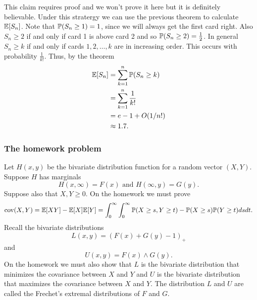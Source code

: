 This claim requires proof and we won't prove it here but it is definitely believable. Under this stratergy we can use the previous theorem to calculate ${\mathbb{E}}[S_n]$. Note that ${\mathbb{P}}(S_n \ge 1) = 1$, since we will always get the first card right. Also $S_n \ge 2$ if and only if card 1 is above card 2 and so ${\mathbb{P}}(S_n \ge 2) = \frac{1}{2}$. In general $S_n \ge k$ if and only if cards $1,2,\ldots, k$ are in increasing order. This occurs with probability $\frac{1}{k!}$. Thus, by the theorem
\begin{align*}
    {\mathbb{E}}[S_n] &= \sum_{k=1}^n {\mathbb{P}}(S_n \ge k)\\
    &= \sum_{k=1}^n \frac{1}{k!}\\
    &= e-1+O(1/n!)\\
    &\approx 1.7.
\end{align*}
\subsubsection{The homework problem}
Let $H(x,y)$ be the bivariate distribution function for a random vector $(X,Y)$. Suppose $H$ has marginals
\[H(x,\infty) = F(x) \text{ and } H(\infty, y) = G(y). \]
Suppose also that $X,Y \ge 0$. On the homework we must prove
\[\text{cov}(X,Y) = {\mathbb{E}}[XY] - {\mathbb{E}}[X]{\mathbb{E}}[Y] = \int_0^\infty \int_0^\infty {\mathbb{P}}(X \ge s, Y \ge t)-{\mathbb{P}}(X \ge s){\mathbb{P}}(Y \ge t) dsdt.\]
Recall the bivariate distributions 
\[L(x,y) = \left(F(x)+G(y)-1\right)_+ \]
and 
\[U(x,y) = F(x)\land G(y). \]
On the homework we must also show that $L$ is the bivariate distribution that minimizes the covariance between $X$ and $Y$ and $U$ is the bivariate distribution that maximizes the covariance between $X$ and $Y$. The distribution $L$ and $U$ are called the Frechet's extremal distributions of $F$ and $G$.
